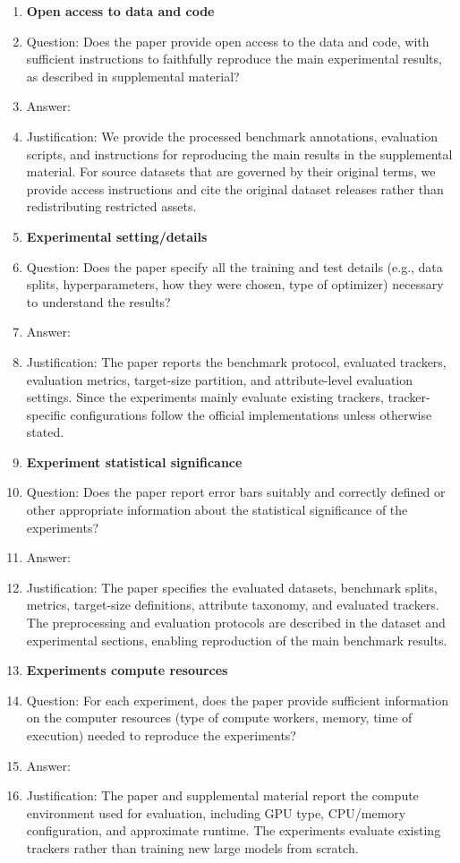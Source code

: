 \begin{enumerate}
\item {\bf Open access to data and code}
    \item[] Question: Does the paper provide open access to the data and code, with sufficient instructions to faithfully reproduce the main experimental results, as described in supplemental material?
    \item[] Answer: \answerYes{}
    \item[] Justification: We provide the processed benchmark annotations, evaluation scripts, and instructions for reproducing the main results in the supplemental material. For source datasets that are governed by their original terms, we provide access instructions and cite the original dataset releases rather than redistributing restricted assets.



\item {\bf Experimental setting/details}
    \item[] Question: Does the paper specify all the training and test details (e.g., data splits, hyperparameters, how they were chosen, type of optimizer) necessary to understand the results?
    \item[] Answer: \answerYes{}
    \item[] Justification: The paper reports the benchmark protocol, evaluated trackers, evaluation metrics, target-size partition, and attribute-level evaluation settings. Since the experiments mainly evaluate existing trackers, tracker-specific configurations follow the official implementations unless otherwise stated.


\item {\bf Experiment statistical significance}
    \item[] Question: Does the paper report error bars suitably and correctly defined or other appropriate information about the statistical significance of the experiments?
    \item[] Answer: \answerYes{}
    \item[] Justification: The paper specifies the evaluated datasets, benchmark splits, metrics, target-size definitions, attribute taxonomy, and evaluated trackers. The preprocessing and evaluation protocols are described in the dataset and experimental sections, enabling reproduction of the main benchmark results.


\item {\bf Experiments compute resources}
    \item[] Question: For each experiment, does the paper provide sufficient information on the computer resources (type of compute workers, memory, time of execution) needed to reproduce the experiments?
    \item[] Answer: \answerYes{}
    \item[] Justification: The paper and supplemental material report the compute environment used for evaluation, including GPU type, CPU/memory configuration, and approximate runtime. The experiments evaluate existing trackers rather than training new large models from scratch.


\end{enumerate}
